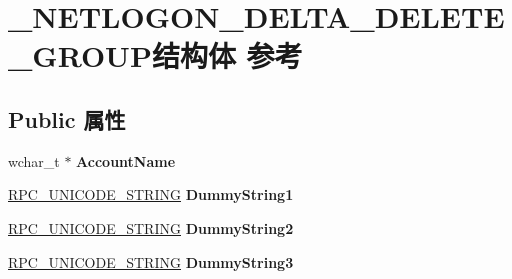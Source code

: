 \hypertarget{struct___n_e_t_l_o_g_o_n___d_e_l_t_a___d_e_l_e_t_e___g_r_o_u_p}{}\section{\+\_\+\+N\+E\+T\+L\+O\+G\+O\+N\+\_\+\+D\+E\+L\+T\+A\+\_\+\+D\+E\+L\+E\+T\+E\+\_\+\+G\+R\+O\+U\+P结构体 参考}
\label{struct___n_e_t_l_o_g_o_n___d_e_l_t_a___d_e_l_e_t_e___g_r_o_u_p}
\subsection*{Public 属性}
\begin{DoxyCompactItemize}
\item 
\mbox{\label{struct___n_e_t_l_o_g_o_n___d_e_l_t_a___d_e_l_e_t_e___g_r_o_u_p_af9d26eaa9f8c75d6a40b28477f7742d3}} 
wchar\+\_\+t $\ast$ {\bfseries Account\+Name}
\item 
\mbox{\label{struct___n_e_t_l_o_g_o_n___d_e_l_t_a___d_e_l_e_t_e___g_r_o_u_p_a8c2907fe180f8ff871eb698c47e25e1c}} 
\hyperlink{struct___r_p_c___u_n_i_c_o_d_e___s_t_r_i_n_g}{R\+P\+C\+\_\+\+U\+N\+I\+C\+O\+D\+E\+\_\+\+S\+T\+R\+I\+NG} {\bfseries Dummy\+String1}
\item 
\mbox{\label{struct___n_e_t_l_o_g_o_n___d_e_l_t_a___d_e_l_e_t_e___g_r_o_u_p_aa846e18b42926740b314c04dd28533c3}} 
\hyperlink{struct___r_p_c___u_n_i_c_o_d_e___s_t_r_i_n_g}{R\+P\+C\+\_\+\+U\+N\+I\+C\+O\+D\+E\+\_\+\+S\+T\+R\+I\+NG} {\bfseries Dummy\+String2}
\item 
\mbox{\label{struct___n_e_t_l_o_g_o_n___d_e_l_t_a___d_e_l_e_t_e___g_r_o_u_p_a4b586f4c0d1f91691d7a2fc44e1d4761}} 
\hyperlink{struct___r_p_c___u_n_i_c_o_d_e___s_t_r_i_n_g}{R\+P\+C\+\_\+\+U\+N\+I\+C\+O\+D\+E\+\_\+\+S\+T\+R\+I\+NG} {\bfseries Dummy\+String3}
\item 
\mbox{\label{struct___n_e_t_l_o_g_o_n___d_e_l_t_a___d_e_l_e_t_e___g_r_o_u_p_a2ada5c3437b976adfc4d65149d89cb4b}} 

\end{DoxyCompactItemize}
